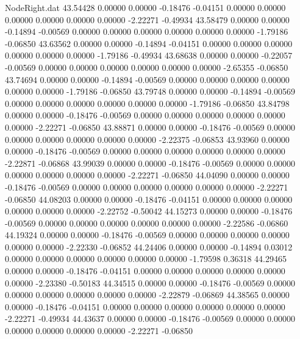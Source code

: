 \begin{filecontents}{NodeRight.dat}
  43.54428    0.00000    0.00000    -0.18476   -0.04151    0.00000    0.00000    0.00000    0.00000    0.00000    0.00000   -2.22271   -0.49934
  43.58479    0.00000    0.00000    -0.14894   -0.00569    0.00000    0.00000    0.00000    0.00000    0.00000    0.00000   -1.79186   -0.06850
  43.63562    0.00000    0.00000    -0.14894   -0.04151    0.00000    0.00000    0.00000    0.00000    0.00000    0.00000   -1.79186   -0.49934
  43.68638    0.00000    0.00000    -0.22057   -0.00569    0.00000    0.00000    0.00000    0.00000    0.00000    0.00000   -2.65355   -0.06850
  43.74694    0.00000    0.00000    -0.14894   -0.00569    0.00000    0.00000    0.00000    0.00000    0.00000    0.00000   -1.79186   -0.06850
  43.79748    0.00000    0.00000    -0.14894   -0.00569    0.00000    0.00000    0.00000    0.00000    0.00000    0.00000   -1.79186   -0.06850
  43.84798    0.00000    0.00000    -0.18476   -0.00569    0.00000    0.00000    0.00000    0.00000    0.00000    0.00000   -2.22271   -0.06850
  43.88871    0.00000    0.00000    -0.18476   -0.00569    0.00000    0.00000    0.00000    0.00000    0.00000    0.00000   -2.22375   -0.06853
  43.93960    0.00000    0.00000    -0.18476   -0.00569    0.00000    0.00000    0.00000    0.00000    0.00000    0.00000   -2.22871   -0.06868
  43.99039    0.00000    0.00000    -0.18476   -0.00569    0.00000    0.00000    0.00000    0.00000    0.00000    0.00000   -2.22271   -0.06850
  44.04090    0.00000    0.00000    -0.18476   -0.00569    0.00000    0.00000    0.00000    0.00000    0.00000    0.00000   -2.22271   -0.06850
  44.08203    0.00000    0.00000    -0.18476   -0.04151    0.00000    0.00000    0.00000    0.00000    0.00000    0.00000   -2.22752   -0.50042
  44.15273    0.00000    0.00000    -0.18476   -0.00569    0.00000    0.00000    0.00000    0.00000    0.00000    0.00000   -2.22586   -0.06860
  44.19324    0.00000    0.00000    -0.18476   -0.00569    0.00000    0.00000    0.00000    0.00000    0.00000    0.00000   -2.22330   -0.06852
  44.24406    0.00000    0.00000    -0.14894    0.03012    0.00000    0.00000    0.00000    0.00000    0.00000    0.00000   -1.79598    0.36318
  44.29465    0.00000    0.00000    -0.18476   -0.04151    0.00000    0.00000    0.00000    0.00000    0.00000    0.00000   -2.23380   -0.50183
  44.34515    0.00000    0.00000    -0.18476   -0.00569    0.00000    0.00000    0.00000    0.00000    0.00000    0.00000   -2.22879   -0.06869
  44.38565    0.00000    0.00000    -0.18476   -0.04151    0.00000    0.00000    0.00000    0.00000    0.00000    0.00000   -2.22271   -0.49934
  44.43637    0.00000    0.00000    -0.18476   -0.00569    0.00000    0.00000    0.00000    0.00000    0.00000    0.00000   -2.22271   -0.06850

\end{filecontents}
